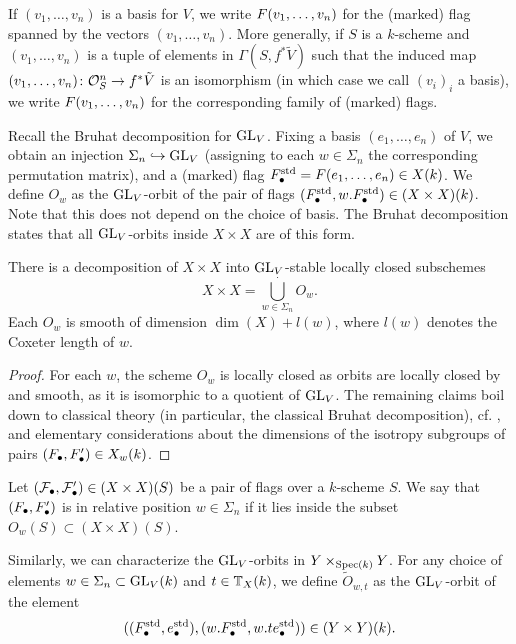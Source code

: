 \documentclass[../main.tex]{subfiles}
\begin{document}
If $(v_1, \dots, v_n)$ is a basis for $V$, we write $F(v_1, \dots, v_n)$ for
the (marked) flag spanned by the vectors $(v_1, \dots, v_n)$. 
More generally, if $S$ is a $k$-scheme and $(v_1, \dots, v_n)$ is a tuple of
elements in $\Gamma(S, f^*\tilde V)$ such that the induced map $(v_1, \dots,
v_n)\colon  \mathcal{O}_S^n \to f^* \tilde V$ is an isomorphism (in which case we call
$(v_i)_i$ a basis), we write $F(v_1, \dots, v_n)$ for the corresponding
family of (marked) flags.

Recall the Bruhat decomposition for $\operatorname{GL}_V$.
Fixing a basis $(e_1, \dots, e_n)$ of $V$, we obtain an injection
$\Sigma_n \hookrightarrow \operatorname{GL}_V$ (assigning to each $w \in \Sigma_n$ the corresponding
permutation matrix), and a (marked) flag $F_\bullet^{\mathrm{std}} = F(e_1, \dots, e_n) \in
X(k)$. We define $O_w$ as the $\operatorname{GL}_V$-orbit
of the pair of flags $(F_\bullet^{\mathrm{std}}, w.F_\bullet^{\mathrm{std}}) \in (X \times X)(k)$.
Note that this does not depend on the choice of basis.
The Bruhat decomposition states that all $\operatorname{GL}_V$-orbits inside $X \times X$ are of 
this form.

\begin{prop}\label{prop:BruhatDecomp}
  There is a decomposition of 
  $X \times X$ into $\operatorname{GL}_V$-stable locally closed subschemes
  \begin{equation*}
    X \times X = \bigcup_{w \in \Sigma_n}^{\cdot} O_w.
  \end{equation*}
  Each $O_w$ is smooth of dimension $\dim(X) + l(w)$, where $l(w)$ denotes the
Coxeter length of $w$.
\begin{proof}
   For each $w$, the scheme $O_w$ is locally closed as orbits are locally
   closed by \cite[Proposition 1.65 b)]{milne2017algebraic} and smooth,
   as it is isomorphic to a quotient of $\operatorname{GL}_V$. The remaining claims
   boil down to classical theory (in particular, the classical Bruhat decomposition),
   cf. \cite[Chapter 21]{milne2017algebraic}, and elementary considerations about 
   the dimensions of the isotropy subgroups of pairs $(F_\bullet, F_\bullet') \in X_w(k)$.
\end{proof}
\end{prop}

Let $(\mathcal{F}_\bullet, \mathcal{F}_\bullet') \in (X \times X)(S)$ be a pair of flags over a $k$-scheme
$S$. We say that $(F_\bullet,F_\bullet')$ is in relative position 
$w \in \Sigma_n$ if it lies inside the subset $O_w(S) \subset (X \times X)(S)$. 

Similarly, we can characterize the $\operatorname{GL}_V$-orbits in $Y \times_{\operatorname{Spec}(k)} Y$.
For any choice of elements $w \in \Sigma_n \subset \operatorname{GL}_V(k)$ and $t \in
\mathbb{T}_X(k)$, we define $\tilde O_{w,t}$ as the $\operatorname{GL}_V$-orbit of the element
$$((F_\bullet^{\mathrm{std}}, e_\bullet^{\mathrm{std}}), (w.F_\bullet^{\mathrm{std}}, w.te_\bullet^{\mathrm{std}})) \in (Y
\times Y)(k).$$ 
\end{document}

